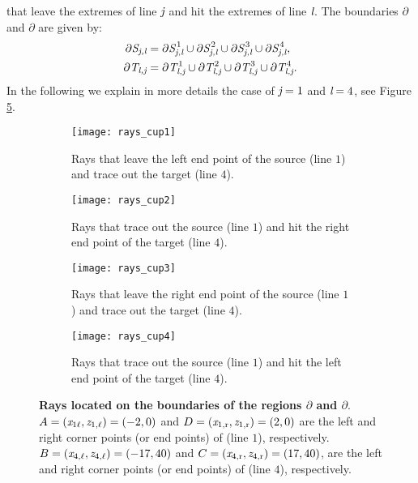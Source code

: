 that leave the extremes of line $\textit{j}$ and hit the extremes of line $\textit{l}$.
The boundaries $\partial$ and $\partial$ are given by:
 \begin{equation}
\label{eq:analytic_boundaries}
 \begin{split}
 \partial\mbox{$\emph{S}_{\textit{\textit{j},\textit{l}}}$} & = \partial\mbox{$\emph{S}_{\textit{\textit{j},\textit{l}}}^{\,1}$}\cup \partial\mbox{$\emph{S}_{\textit{\textit{j},\textit{l}}}^{\,2}$} \cup \partial\mbox{$\emph{S}_{\textit{\textit{j},\textit{l}}}^{\,3}$}\cup \partial\mbox{$\emph{S}_{\textit{\textit{j},\textit{l}}}^{\,4}$},\\
\partial\mbox{$\emph{T}_{\textit{\textit{l},\textit{j}}}$} & = \partial\mbox{$\emph{T}_{\textit{\textit{l},\textit{j}}}^{\,1}$}\cup \partial\mbox{$\emph{T}_{\textit{\textit{l},\textit{j}}}^{\,2}$}\cup \partial\mbox{$\emph{T}_{\textit{\textit{l},\textit{j}}}^{\,3}$}\cup \partial\mbox{$\emph{T}_{\textit{\textit{l},\textit{j}}}^{\,4}$}.
 \end{split}
 \end{equation}
In the following we explain in more details the case of $\textit{\textit{j}}=1$ and $\textit{\textit{l}}=4$, see Figure \ref{fig:cups}.
\begin{figure}[h]
\centering
\begin{subfigure}{.48\textwidth}
  \centering
  \texttt{[image: rays\_cup1]}
  \caption{Rays that leave the left end point of the source (line $1$) and trace out the target (line $4$).}
  \label{fig:cup1}
\end{subfigure}%
\hfill
\begin{subfigure}{.48\textwidth}
  \centering
  \texttt{[image: rays\_cup2]}
  \caption{Rays that trace out the source (line $1$) and hit the right end point of the target (line $4$).}
  \label{fig:cup2}
\end{subfigure} %
\hfill
\begin{subfigure}{.48\textwidth}
  \centering
  \texttt{[image: rays\_cup3]}
  \caption{Rays that leave the right end point of the source (line $1$) and trace out the target (line $4$).}
  \label{fig:cup3}
\end{subfigure}%
\hfill
\begin{subfigure}{.48\textwidth}
  \centering
  \texttt{[image: rays\_cup4]}
  \caption{Rays that trace out the source (line $1$) and hit the left end point of the target (line $4$).}
  \label{fig:cup4}
\end{subfigure}
\caption{\textbf{Rays located on the boundaries of the regions $\partial$ and $\partial$}.
$A = (\textit{x}_{1 \ell}, \textit{z}_{1, \ell}) =(-2, 0)$ and 
$D = (\textit{x}_{1, \textrm{r}}, \textit{z}_{1, \textrm{r}}) = (2, 0)$ 
are the left and right corner points (or end points) of
 (line $1$), respectively.
$B =  (\textit{x}_{4, \ell}, \textit{z}_{4, \ell}) = (-17, 40)$ and $C =  (\textit{x}_{4, \textrm{r}}, \textit{z}_{4, \textrm{r}}) = (17 , 40)$, are the left and right corner points (or end points) of  (line $4$), respectively.}
\label{fig:cups}
\end{figure} \\
